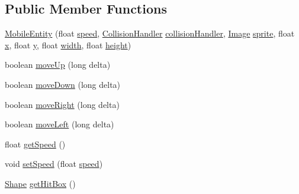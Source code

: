 \subsection*{Public Member Functions}
\begin{DoxyCompactItemize}
\item 
\mbox{\hyperlink{classentities_1_1_mobile_entity_a41aad516f10a2ca7b8ac68dabed30312}{Mobile\+Entity}} (float \mbox{\hyperlink{classentities_1_1_mobile_entity_a815a9d2b23a0bb7e3ee7739d4c10d7c3}{speed}}, \mbox{\hyperlink{classentities_1_1_collision_handler}{Collision\+Handler}} \mbox{\hyperlink{classentities_1_1_mobile_entity_a29fbe797671b1fc81eafe1e48fdc46f9}{collision\+Handler}}, \mbox{\hyperlink{classorg_1_1newdawn_1_1slick_1_1_image}{Image}} \mbox{\hyperlink{classentities_1_1_physical_entity_aeb439b2308ab19fb6d3ff6be6f7cdbd8}{sprite}}, float \mbox{\hyperlink{classorg_1_1newdawn_1_1slick_1_1geom_1_1_shape_a3e985bfff386c15a4efaad03d8ad60d3}{x}}, float \mbox{\hyperlink{classorg_1_1newdawn_1_1slick_1_1geom_1_1_shape_a9f934baded6a1b65ebb69e7e5f80ea00}{y}}, float \mbox{\hyperlink{classorg_1_1newdawn_1_1slick_1_1geom_1_1_rectangle_a967e1823f62daf45abb142779d1be62d}{width}}, float \mbox{\hyperlink{classorg_1_1newdawn_1_1slick_1_1geom_1_1_rectangle_a3bd010fdce636fc11ed0e0ad4d4b4a0a}{height}})
\item 
boolean \mbox{\hyperlink{classentities_1_1_mobile_entity_afa8c8461f80d4c39aef4a66d483a8b8a}{move\+Up}} (long delta)
\item 
boolean \mbox{\hyperlink{classentities_1_1_mobile_entity_a0017810fbe9ef38039f90044cdecb2e6}{move\+Down}} (long delta)
\item 
boolean \mbox{\hyperlink{classentities_1_1_mobile_entity_a5b26e1dec0828ec7079ec5d29ecf4f30}{move\+Right}} (long delta)
\item 
boolean \mbox{\hyperlink{classentities_1_1_mobile_entity_aee779d276685e05da66f3d1203535838}{move\+Left}} (long delta)
\item 
float \mbox{\hyperlink{classentities_1_1_mobile_entity_a21020e5f09194aae693dbce8d7d59ffa}{get\+Speed}} ()
\item 
void \mbox{\hyperlink{classentities_1_1_mobile_entity_a8b9394d985435fba88149c9dded2e69d}{set\+Speed}} (float \mbox{\hyperlink{classentities_1_1_mobile_entity_a815a9d2b23a0bb7e3ee7739d4c10d7c3}{speed}})
\item 
\mbox{\hyperlink{classorg_1_1newdawn_1_1slick_1_1geom_1_1_shape}{Shape}} \mbox{\hyperlink{classentities_1_1_mobile_entity_a7192f025dc20283c5eee9efb9d5b4b6f}{get\+Hit\+Box}} ()
\item 

\end{DoxyCompactItemize}
